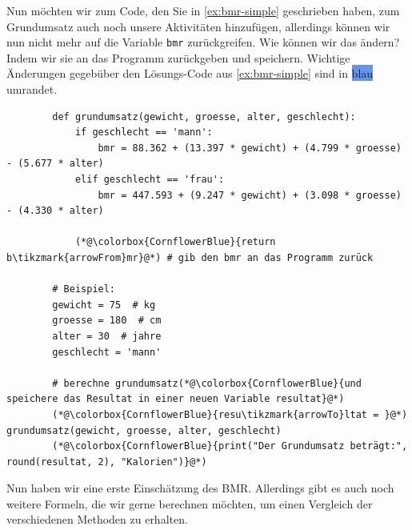 Nun möchten wir zum Code, den Sie in \cref{ex:bmr-simple} geschrieben haben, zum Grundumsatz auch noch unsere Aktivitäten hinzufügen, allerdings können wir nun nicht mehr auf die Variable \texttt{bmr} zurückgreifen. Wie können wir das ändern? Indem wir sie an das Programm zurückgeben und speichern. Wichtige Änderungen gegebüber den Lösungs-Code aus \cref{ex:bmr-simple} sind in \colorbox{CornflowerBlue}{blau} umrandet.

\begin{minipage}{\linewidth}
	\begin{lstlisting}
		def grundumsatz(gewicht, groesse, alter, geschlecht):
			if geschlecht == 'mann':
				bmr = 88.362 + (13.397 * gewicht) + (4.799 * groesse) - (5.677 * alter)
			elif geschlecht == 'frau':
				bmr = 447.593 + (9.247 * gewicht) + (3.098 * groesse) - (4.330 * alter)
			
			(*@\colorbox{CornflowerBlue}{return b\tikzmark{arrowFrom}mr}@*) # gib den bmr an das Programm zurück
		
		# Beispiel:
		gewicht = 75  # kg
		groesse = 180  # cm
		alter = 30  # jahre
		geschlecht = 'mann'
		
		# berechne grundumsatz(*@\colorbox{CornflowerBlue}{und speichere das Resultat in einer neuen Variable resultat}@*)
		(*@\colorbox{CornflowerBlue}{resu\tikzmark{arrowTo}ltat = }@*) grundumsatz(gewicht, groesse, alter, geschlecht)
		(*@\colorbox{CornflowerBlue}{print("Der Grundumsatz beträgt:", round(resultat, 2), "Kalorien")}@*)
	\end{lstlisting}
\end{minipage}


Nun haben wir eine erste Einschätzung des \gls{BMR}. Allerdings gibt es auch noch weitere Formeln, die wir gerne berechnen möchten, um einen Vergleich der verschiedenen Methoden zu erhalten.

